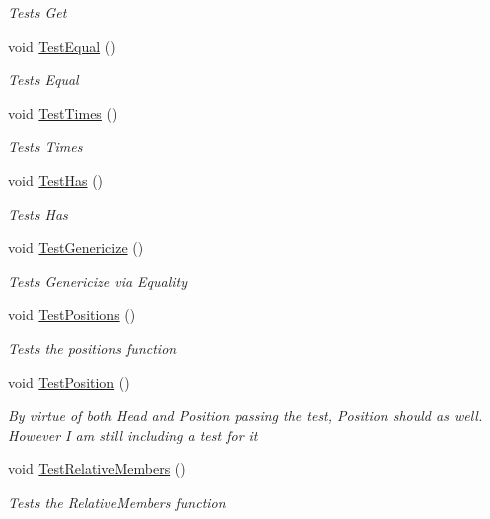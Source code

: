 \begin{DoxyCompactItemize}
\begin{DoxyCompactList}\small\item\em Tests Get \end{DoxyCompactList}\item 
void \hyperlink{classHumDrumTests_1_1Collections_1_1Information_a8aca8bd7bcf86c773b842f23d4b8fd94}{Test\+Equal} ()
\begin{DoxyCompactList}\small\item\em Tests Equal \end{DoxyCompactList}\item 
void \hyperlink{classHumDrumTests_1_1Collections_1_1Information_a3abf8aa3d994681399c94ca9d81381a6}{Test\+Times} ()
\begin{DoxyCompactList}\small\item\em Tests Times \end{DoxyCompactList}\item 
void \hyperlink{classHumDrumTests_1_1Collections_1_1Information_ad95bc6ede3653b323af915feb44ae1c9}{Test\+Has} ()
\begin{DoxyCompactList}\small\item\em Tests Has \end{DoxyCompactList}\item 
void \hyperlink{classHumDrumTests_1_1Collections_1_1Information_a82b372e763703189a6d970cb309c84b0}{Test\+Genericize} ()
\begin{DoxyCompactList}\small\item\em Tests Genericize via Equality \end{DoxyCompactList}\item 
void \hyperlink{classHumDrumTests_1_1Collections_1_1Information_af327f18ce9db1420f1603dadb1e2acbb}{Test\+Positions} ()
\begin{DoxyCompactList}\small\item\em Tests the positions function \end{DoxyCompactList}\item 
void \hyperlink{classHumDrumTests_1_1Collections_1_1Information_a0abbc714e07956429ff1731c72863790}{Test\+Position} ()
\begin{DoxyCompactList}\small\item\em By virtue of both Head and Position passing the test, Position should as well. However I am still including a test for it \end{DoxyCompactList}\item 
void \hyperlink{classHumDrumTests_1_1Collections_1_1Information_aa2f164c84590c2086232fd51ca77b3b2}{Test\+Relative\+Members} ()
\begin{DoxyCompactList}\small\item\em Tests the Relative\+Members function \end{DoxyCompactList}\end{DoxyCompactItemize}


